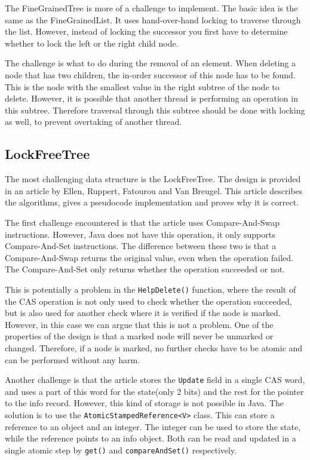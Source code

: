 \documentclass[a4paper]{article}
\begin{document}
The FineGrainedTree is more of a challenge to implement. The basic idea is the same as the
FineGrainedList. It uses hand-over-hand locking to traverse through the list. However,
instead of locking the successor you first have to determine whether to lock the left or
the right child node.

The challenge is what to do during the removal of an element. When deleting a node that
has two children, the in-order successor of this node has to be found. This is the node
with the smallest value in the right subtree of the node to delete. However, it is
possible that another thread is performing an operation in this subtree. Therefore
traversal through this subtree should be done with locking as well, to prevent overtaking
of another thread.

\subsection{LockFreeTree}

The most challenging data structure is the LockFreeTree. The design is provided in an
article by Ellen, Ruppert, Fatourou and Van Breugel.\cite{lft} This article describes the
algorithms, gives a pseudocode implementation and proves why it is correct.

The first challenge encountered is that the article uses Compare-And-Swap instructions.
However, Java does not have this operation, it only supports Compare-And-Set instructions.
The difference between these two is that a Compare-And-Swap returns the original value,
even when the operation failed. The Compare-And-Set only returns whether the operation
succeeded or not.

This is potentially a problem in the \texttt{HelpDelete()} function, where the result of
the CAS operation is not only used to check whether the operation succeeded, but is also
used for another check where it is verified if the node is marked. However, in this
case we can argue that this is not a problem. One of the properties of the design is that
a marked node will never be unmarked or changed. Therefore, if a node is marked, no
further checks have to be atomic and can be performed without any harm.

Another challenge is that the article stores the \texttt{Update} field in a single CAS
word, and uses a part of this word for the state(only 2 bits) and the rest for the pointer
to the info record. However, this kind of storage is not possible in Java. The solution is
to use the \texttt{AtomicStampedReference<V>} class. This can store a reference to an
object and an integer. The integer can be used to store the state, while the reference
points to an info object. Both can be read and updated in a single atomic step by
\texttt{get()} and \texttt{compareAndSet()} respectively.
\end{document}
